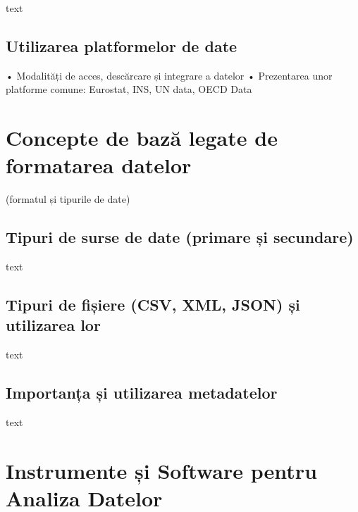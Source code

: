 \documentclass[
  11pt,
  b5paper,
  nottoc]{book}
\begin{document}
text

\hypertarget{utilizarea-platformelor-de-date-3}{%
\subsection{Utilizarea platformelor de
date}\label{utilizarea-platformelor-de-date-3}}

• Modalități de acces, descărcare și integrare a datelor • Prezentarea
unor platforme comune: Eurostat, INS, UN data, OECD Data

\hypertarget{concepte-de-bazux103-legate-de-formatarea-datelor-3}{%
\section{Concepte de bază legate de formatarea
datelor}\label{concepte-de-bazux103-legate-de-formatarea-datelor-3}}

(formatul și tipurile de date)

\hypertarget{tipuri-de-surse-de-date-primare-ux219i-secundare-3}{%
\subsection{Tipuri de surse de date (primare și
secundare)}\label{tipuri-de-surse-de-date-primare-ux219i-secundare-3}}

text

\hypertarget{tipuri-de-fiux219iere-csv-xml-json-ux219i-utilizarea-lor-3}{%
\subsection{Tipuri de fișiere (CSV, XML, JSON) și utilizarea
lor}\label{tipuri-de-fiux219iere-csv-xml-json-ux219i-utilizarea-lor-3}}

text

\hypertarget{importanux21ba-ux219i-utilizarea-metadatelor-3}{%
\subsection{Importanța și utilizarea
metadatelor}\label{importanux21ba-ux219i-utilizarea-metadatelor-3}}

text

\hypertarget{instrumente-ux219i-software-pentru-analiza-datelor-3}{%
\section{Instrumente și Software pentru Analiza
Datelor}\label{instrumente-ux219i-software-pentru-analiza-datelor-3}}
\end{document}
